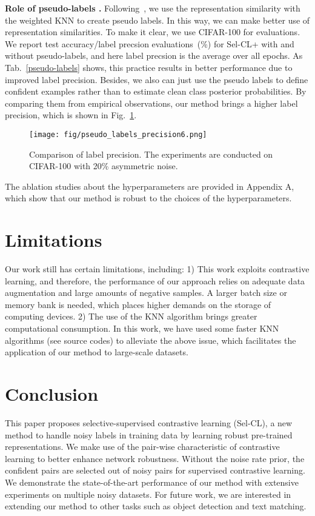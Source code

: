 \documentclass[10pt,twocolumn,letterpaper]{article}
\newcommand{\myPara}[1]{\vspace{.05in}\noindent\textbf{#1}}
\begin{document}
\myPara{Role of pseudo-labels .} Following~\cite{Ortego2021}, we use the representation similarity with the weighted KNN to create pseudo labels.  In this way, we can make better use of representation similarities. To make it clear, we use CIFAR-100 for evaluations. We report test accuracy/label precsion
evaluations~(\%) for Sel-CL+ with and without pseudo-labels, and here label precsion is the average over all epochs. 
As Tab.~\ref{pseudo-labels} shows, this practice results in better performance due to improved label precision. Besides, we also can just use the pseudo labels to define confident examples rather than to estimate clean class posterior probabilities. By comparing them from empirical observations, our method brings a higher label precision, which is shown in Fig.~\ref{fig:precision}. 

\begin{figure}[ht]
	\centering
	\texttt{[image: fig/pseudo\_labels\_precision6.png]}
	\vspace{-3pt}
	\caption{Comparison of label precision. The experiments are conducted on CIFAR-100 with 20\% asymmetric noise.}
	\vspace{-3pt}
	\label{fig:precision}
\end{figure}

The ablation studies about the hyperparameters are provided in Appendix A, which show that our method is robust to the choices of the hyperparameters.
\vspace{-3pt}
\section{Limitations}
Our work still has certain limitations, including: 
1) This work exploits contrastive learning, and therefore,
the performance of our approach relies on adequate data
augmentation and large amounts of negative samples. A
larger batch size or memory bank is needed, which places
higher demands on the storage of computing devices.
2) The use of the KNN algorithm brings greater computational consumption. In this work, we have used some
faster KNN algorithms (see source codes) to alleviate the
above issue, which facilitates the application of our method
to large-scale datasets.

\vspace{-5pt}
\section{Conclusion}\label{sec:5}
This paper proposes selective-supervised contrastive learning (Sel-CL), a new method to handle noisy labels in training data by learning robust pre-trained representations. We make use of the pair-wise characteristic of contrastive learning to better enhance network robustness. Without the noise rate prior, the confident pairs are selected out of noisy pairs for supervised contrastive learning. We demonstrate the state-of-the-art performance of our method with extensive experiments on multiple noisy datasets. For future work, we are interested in extending our method to other tasks such as object detection and text matching.
\end{document}
